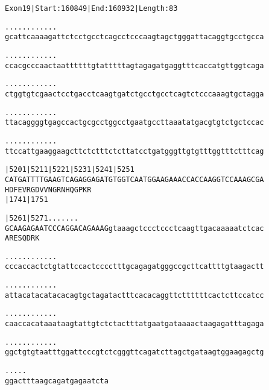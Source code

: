 \documentclass{article}
\begin{document}
\begin{alltt}
Exon 19 | Start: 160849 | End: 160932 | Length: 83

.    .    .    .    .    .    .    .    .    .    .    .    
gcattcaaaagattctcctgcctcagcctcccaagtagctgggattacaggtgcctgcca

.    .    .    .    .    .    .    .    .    .    .    .    
ccacgcccaactaattttttgtatttttagtagagatgaggtttcaccatgttggtcaga

.    .    .    .    .    .    .    .    .    .    .    .    
ctggtgtcgaactcctgacctcaagtgatctgcctgcctcagtctcccaaagtgctagga

.    .    .    .    .    .    .    .    .    .    .    .    
ttacaggggtgagccactgcgcctggcctgaatgccttaaatatgacgtgtctgctccac

.    .    .    .    .    .    .    .    .    .    .    .    
ttccattgaaggaagcttctctttctcttatcctgatgggttgtgtttggtttctttcag

       |5201     |5211     |5221     |5231     |5241     |5251
CATGATTTTGAAGTCAGAGGAGATGTGGTCAATGGAAGAAACCACCAAGGTCCAAAGCGA
H  D  F  E  V  R  G  D  V  V  N  G  R  N  H  Q  G  P  K  R  
                           |1741                         |1751

       |5261     |5271      .    .    .    .    .    .    . 
GCAAGAGAATCCCAGGACAGAAAGgtaaagctccctccctcaagttgacaaaaatctcac
A  R  E  S  Q  D  R  K                                      

   .    .    .    .    .    .    .    .    .    .    .    . 
cccaccactctgtattccactcccctttgcagagatgggccgcttcattttgtaagactt

   .    .    .    .    .    .    .    .    .    .    .    . 
attacatacatacacagtgctagatactttcacacaggttcttttttcactcttccatcc

   .    .    .    .    .    .    .    .    .    .    .    . 
caaccacataaataagtattgtctctactttatgaatgataaaactaagagatttagaga

   .    .    .    .    .    .    .    .    .    .    .    . 
ggctgtgtaatttggattcccgtctcgggttcagatcttagctgataagtggaagagctg

   .    .    .    .    .
ggactttaagcagatgagaatcta
\end{alltt}
\newpage
\end{document}
